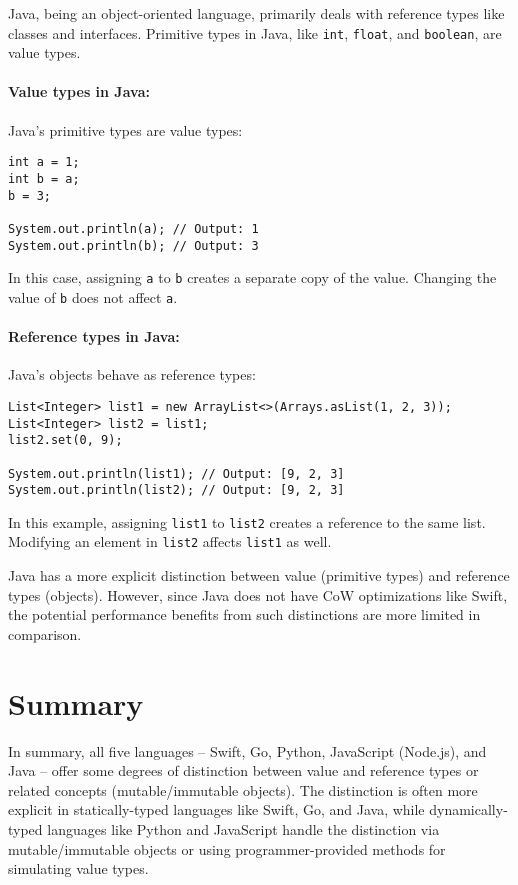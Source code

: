 Java, being an object-oriented language, primarily deals with reference types like classes and interfaces. Primitive types in Java, like \texttt{int}, \texttt{float}, and \texttt{boolean}, are value types.

\paragraph{Value types in Java:}
Java's primitive types are value types:

\begin{verbatim}
int a = 1;
int b = a;
b = 3;

System.out.println(a); // Output: 1
System.out.println(b); // Output: 3
\end{verbatim}

In this case, assigning \texttt{a} to \texttt{b} creates a separate copy of the value. Changing the value of \texttt{b} does not affect \texttt{a}.

\paragraph{Reference types in Java:}
Java's objects behave as reference types:

\begin{verbatim}
List<Integer> list1 = new ArrayList<>(Arrays.asList(1, 2, 3));
List<Integer> list2 = list1;
list2.set(0, 9);

System.out.println(list1); // Output: [9, 2, 3]
System.out.println(list2); // Output: [9, 2, 3]
\end{verbatim}

In this example, assigning \texttt{list1} to \texttt{list2} creates a reference to the same list. Modifying an element in \texttt{list2} affects \texttt{list1} as well.

Java has a more explicit distinction between value (primitive types) and reference types (objects). However, since Java does not have CoW optimizations like Swift, the potential performance benefits from such distinctions are more limited in comparison.

\section{Summary}

In summary, all five languages -- Swift, Go, Python, JavaScript (Node.js), and Java -- offer some degrees of distinction between value and reference types or related concepts (mutable/immutable objects). The distinction is often more explicit in statically-typed languages like Swift, Go, and Java, while dynamically-typed languages like Python and JavaScript handle the distinction via mutable/immutable objects or using programmer-provided methods for simulating value types.

